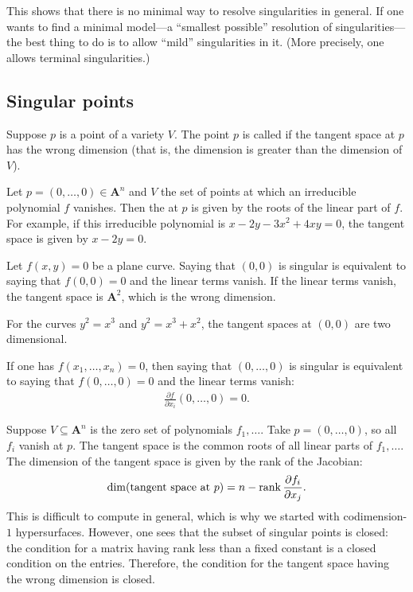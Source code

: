 \documentclass [11 pt, oneside, margin = 1 in] {article}
\begin{document}
	This shows that there is no minimal way to resolve singularities in general. If one wants to find a minimal model---a ``smallest possible'' resolution of singularities---the best thing to do is to allow ``mild'' singularities in it. (More precisely, one allows terminal singularities.)

\subsection{Singular points}
Suppose $p$ is a point of a variety $V$. The point $p$ is called  if the tangent space at $p$ has the wrong dimension (that is, the dimension is greater than the dimension of $V$).

Let $p=(0,\hdots, 0)\in  \mathbf{A}^n$ and $V$ the set of points at which an irreducible polynomial $f$ vanishes. Then the  at $p$ is given by the roots of the linear part of $f$. For example, if this irreducible polynomial is $x-2y-3x^2+4xy =0$, the tangent space is given by $x-2y=0$.

Let $f(x,y)=0$ be a plane curve. Saying that $(0,0)$ is singular is equivalent to saying that $f(0,0)=0$ and the linear terms vanish. If the linear terms vanish, the tangent space is $\mathbf{A}^2$, which is the wrong dimension.

\begin{example}[ ]\label{}\text{}
For the curves $y^2 = x^3$ and $y^2 = x^3+x^2$, the tangent spaces at $(0,0)$ are two dimensional.
\end{example}

If one has $f(x_1,\hdots, x_n) =0$, then saying that $(0,\hdots, 0)$ is singular is equivalent to saying that $f(0,\hdots,0)=0$ and the linear terms vanish: 
\begin{align*}
	\frac{\partial f}{\partial x_i}(0,\hdots, 0) =0.
\end{align*}

Suppose $V\subseteq \mathbf{A}^n$ is the zero set of polynomials $f_1,\hdots$. Take $p=(0,\hdots, 0)$, so all $f_i$ vanish at $p$. The tangent space is the common roots of all linear parts of $f_1,\hdots$. The dimension of the tangent space is given by the rank of the Jacobian:
\begin{align*}
	\dim(\textrm{tangent space at $p$}) = n-\operatorname{rank} \frac{\partial f_i}{\partial x_j}.
\end{align*}
This is difficult to compute in general, which is why we started with codimension-$1$ hypersurfaces. However, one sees that the subset of singular points is closed: the condition for a matrix having rank less than a fixed constant is a closed condition on the entries. Therefore, the condition for the tangent space having the wrong dimension is closed.
\end{document}
